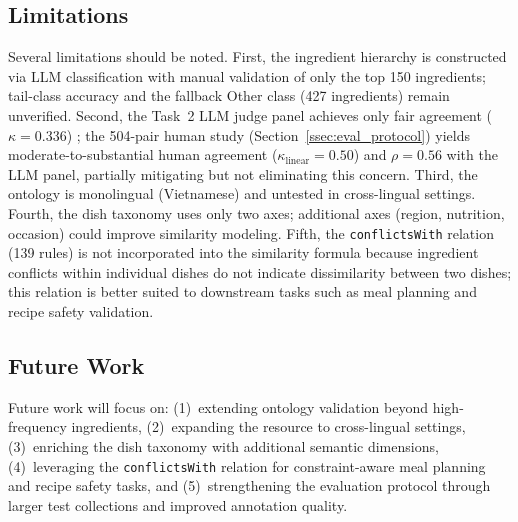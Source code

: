 \label{sec:limitations}

\subsection{Limitations}

Several limitations should be noted. First, the ingredient hierarchy is constructed via LLM classification with manual validation of only the top 150 ingredients; tail-class accuracy and the fallback Other class (427 ingredients) remain unverified. Second, the Task~2 LLM judge panel achieves only fair agreement ($\kappa = 0.336$) \cite{zheng2023judge, chen2024judgebias, huang2025llmjudge}; the 504-pair human study (Section~\ref{ssec:eval_protocol}) yields moderate-to-substantial human agreement ($\kappa_{\text{linear}} = 0.50$) and $\rho = 0.56$ with the LLM panel, partially mitigating but not eliminating this concern. Third, the ontology is monolingual (Vietnamese) and untested in cross-lingual settings. Fourth, the dish taxonomy uses only two axes; additional axes (region, nutrition, occasion) could improve similarity modeling. Fifth, the \texttt{conflictsWith} relation (139 rules) is not incorporated into the similarity formula because ingredient conflicts within individual dishes do not indicate dissimilarity between two dishes; this relation is better suited to downstream tasks such as meal planning and recipe safety validation.

\subsection{Future Work}
Future work will focus on: (1)~extending ontology validation beyond high-frequency ingredients, (2)~expanding the resource to cross-lingual settings, (3)~enriching the dish taxonomy with additional semantic dimensions, (4)~leveraging the \texttt{conflictsWith} relation for constraint-aware meal planning and recipe safety tasks, and (5)~strengthening the evaluation protocol through larger test collections and improved annotation quality.
